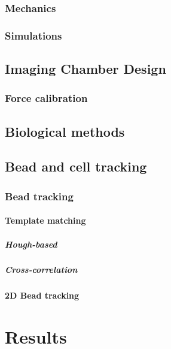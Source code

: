\subsubsection{Mechanics}
\subsubsection{Simulations}
\subsection{Imaging Chamber Design}
\subsubsection{Force calibration}
\subsection{Biological methods}
\subsection{Bead and cell tracking}
\subsubsection{Bead tracking}
\paragraph{Template matching}
\subparagraph{Hough-based}
\subparagraph{Cross-correlation}
\paragraph{2D Bead tracking}
\section{Results}

